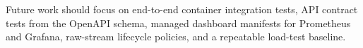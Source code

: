 \documentclass[11pt,a4paper]{article}
\begin{document}
Future work should focus on end-to-end container integration tests, API contract tests from the OpenAPI schema, managed dashboard manifests for Prometheus and Grafana, raw-stream lifecycle policies, and a repeatable load-test baseline.

\newpage
\nocite{abs_api,gdelt,bluesky_api,mastodon_api,kubernetes_docs,fission_docs,elasticsearch_docs,vader}


\end{document}
